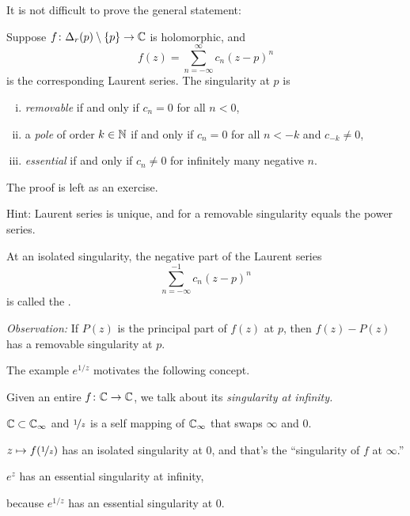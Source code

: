 \documentclass[10pt,aspectratio=169]{beamer}
\begin{document}
\begin{frame}
It is not difficult to prove the general statement:

\begin{proposition}
Suppose $f \colon \Delta_r(p) \setminus \{p\} \to {\mathbb{C}}$ is holomorphic,
and
\begin{equation*}
f(z) = \sum_{n=-\infty}^\infty c_n {(z-p)}^n
\end{equation*}
is the corresponding Laurent series.
\pause
The singularity at $p$ is
\begin{enumerate}[(i)]
\item
\emph{removable} if and only if $c_n = 0$ for all $n < 0$,
\item
\pause
a \emph{pole} of order $k \in {\mathbb{N}}$ if and only if $c_n = 0$ for all $n < -k$ and
$c_{-k}
\not= 0$,
\item
\pause
\emph{essential} if and only if $c_n \not= 0$ for infinitely many negative $n$.
\end{enumerate}
\end{proposition}

\pause

The proof is left as an exercise.

\pause
Hint: Laurent series is unique, and for a removable singularity
equals the power series.

\end{frame}

\begin{frame}

\begin{definition}
At an isolated singularity, the negative part of the Laurent series
\begin{equation*}
\sum_{n=-\infty}^{-1} c_n {(z-p)}^n 
\end{equation*}
is called the \emph{}.
\end{definition}

\pause

\emph{Observation:}
If $P(z)$ is the principal part of $f(z)$ at $p$, then
$f(z)-P(z)$ has a removable singularity at $p$.
\end{frame}

\begin{frame}
The example $e^{1/z}$ motivates the following concept.

\medskip
\pause

Given an entire $f \colon {\mathbb{C}} \to {\mathbb{C}}$, we talk about its
\emph{singularity at infinity.}

\medskip
\pause

${\mathbb{C}} \subset {\mathbb{C}}_{\infty}$ and $\nicefrac{1}{z}$ is a self mapping of
${\mathbb{C}}_{\infty}$ that swaps $\infty$ and $0$.

\medskip
\pause

$z \mapsto f(\nicefrac{1}{z})$ has an isolated singularity
at $0$, and that's the ``singularity of $f$ at $\infty$.''

\medskip
\pause

$e^z$ has an essential singularity at infinity,

because
$e^{1/z}$ has an essential singularity at $0$.

\end{frame}
\end{document}
